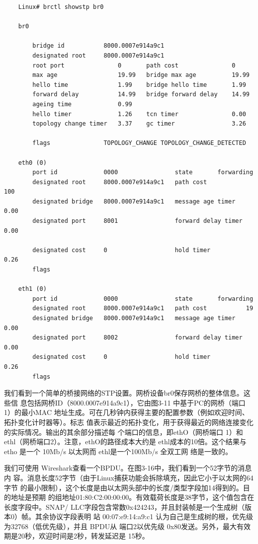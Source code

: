 \begin{verbatim}
    Linux# brctl showstp br0

    br0

        bridge id           8000.0007e914a9c1
        designated root     8000.0007e914a9c1
        root port               0       path cost               0
        max age                 19.99   bridge max age          19.99
        hello time              1.99    bridge hello time       1.99
        forward delay           14.99   bridge forward delay    14.99
        ageing time             0.99
        hello timer             1.26    tcn timer               0.00
        topology change timer   3.37    gc timer                3.26

        flags               TOPOLOGY_CHANGE TOPOLOGY_CHANGE_DETECTED

    eth0 (0)
        port id             0000                state       forwarding
        designated root     8000.0007e914a9c1   path cost           100
        designated bridge   8000.0007e914a9c1   message age timer   0.00
        designated port     8001                forward delay timer 0.00

        designated cost     0                   hold timer          0.26
        flags

    eth1 (0)
        port id             0000                state       forwarding
        designated root     8000.0007e914a9c1   path cost           19
        designated bridge   8000.0007e914a9c1   message age timer   0.00
        designated port     8002                forward delay timer 0.00
        designated cost     0                   hold timer          0.26
        flags
\end{verbatim}

我们看到一个简单的桥接网络的STP设置。网桥设备br0保存网桥的整体信息。这些信
息包括网桥ID（8000.0007e914a9c1），它由图3-11 中基于PC的网桥（端口 1）的最小MAC
地址生成。可在几秒钟内获得主要的配置参数（例如欢迎时间、拓扑变化计时器等）。标志
值表示最近的拓扑变化，用于获得最近的网络连接变化的实际情况。输出的其余部分描述每
个端口的信息，即ethO（网桥端口 1）和 ethl（网桥端口2）。注意，ethO的路径成本大约是
ethl成本的10倍。这个结果与 etho 是一个 10Mb/s 以太网而 ethl是一个100Mb/s 全双工网
络是一致的。

我们可使用 Wireshark查看一个BPDU。在图3-16中，我们看到一个52字节的消息内
容。消息长度52字节（由于Linux捕获功能会拆除填充，因此它小于以太网的64字节
的最小限制），这个长度是由以太网头部中的长度/类型字段加14得到的。目的地址是预期
的组地址01:80:C2:00:00:00。有效载荷长度是38字节，这个值包含在长度字段中。SNAP/
LLC字段包含常数0x424243，并且封装帧是一个生成树（版本0）帧。其余协议字段表明
站 00:07:e9:14:a9:c1 认为自己是生成树的根，优先级为32768（低优先级），并且 BPDU从
端口2以优先级 0x80发送。另外，最大有效期是20秒，欢迎时间是2秒，转发延迟是
15秒。

